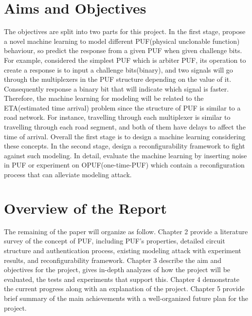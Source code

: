 \section{Aims and Objectives}
The objectives are split into two parts for this project. In the first stage, propose a novel machine learning to model different PUF(physical unclonable function)
behaviour, so predict the response from a given PUF when given challenge bits. For example, considered the simplest PUF which is arbiter PUF, its operation to create a response is to
input a challenge bits(binary), and two signals will go through the multiplexers in the PUF structure depending on the value of it. Consequently response a binary bit
that will indicate which signal is faster. Therefore, the machine learning for modeling will be related to the ETA(estimated time arrival) problem since the structure of PUF is similar to a road network. 
For instance, travelling through each multiplexer is similar to travelling through each road segment, and both of them have delays to affect the time of arrival. Overall the first stage is to design a machine learning
considering these concepts. In the second stage, design a reconfigurability framework to fight against such modeling. In detail, evaluate the machine learning by inserting noise in PUF or experiment on OPUF(one-time-PUF) which
contain a reconfiguration process that can alleviate modeling attack.

\section{Overview of the Report}
The remaining of the paper will organize as follow. Chapter 2 provide a literature survey of the concept of PUF, including PUF's properties, detailed circuit structure and authentication process, 
existing modeling attack with experiment results, and reconfigurability framework. Chapter 3 describe the aim and objectives for the project, gives in-depth analyzes of how the project will be evaluated, 
the tests and experiments that support this. Chapter 4 demonstrate the current progress along with an explanation of the project. Chapter 5 provide brief summary of the main achievements with a well-organized future plan for the project.
